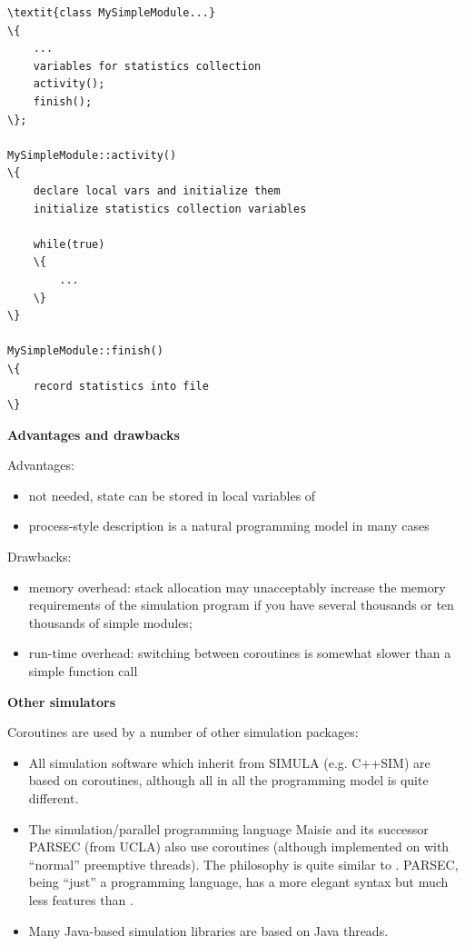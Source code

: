 \begin{Verbatim}[commandchars=\\\{\}]
\textit{class MySimpleModule...}
\{
    ...
    variables for statistics collection
    activity();
    finish();
\};

MySimpleModule::activity()
\{
    declare local vars and initialize them
    initialize statistics collection variables

    while(true)
    \{
        ...
    \}
\}

MySimpleModule::finish()
\{
    record statistics into file
\}
\end{Verbatim}



\textbf{Advantages and drawbacks}

Advantages:
\begin{itemize}
\item{ not needed, state can be stored in local
    variables of }
\item{process-style description is a natural programming model in many
    cases}
\end{itemize}

Drawbacks:
\begin{itemize}
\item{memory overhead: stack allocation may unacceptably increase the
    memory requirements of the simulation program if you have several
    thousands or ten thousands of simple modules;}
\item{run-time overhead: switching between coroutines is somewhat slower
    than a simple function call}
\end{itemize}


\textbf{Other simulators}


Coroutines are used by a number of other simulation packages:
\begin{itemize}
\item{All simulation software which inherit from SIMULA (e.g. C++SIM)
    are based on coroutines, although all in all the programming
    model is quite different.}
\item{The simulation/parallel programming language Maisie and its successor
    PARSEC (from UCLA) also use coroutines (although implemented
    on with ``normal'' preemptive threads). The philosophy
    is quite similar to {\opp}. PARSEC, being ``just''
    a programming language, has a more elegant syntax but much less
    features than {\opp}.}
\item{Many Java-based simulation libraries are based on Java
    threads.}
\end{itemize}




